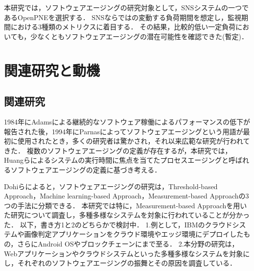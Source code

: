 \documentclass[twoside,twocolumn,10pt]{jarticle}  %
\begin{document}
本研究では，ソフトウェアエージングの研究対象として，SNSシステムの一つであるOpenPNEを選択する．
SNSならではの変動する負荷期間を想定し，監視期間における3種類のメトリクスに着目する．
その結果，比較的低い一定負荷においても，少なくともソフトウェアエージングの潜在可能性を確認できた(暫定)．

\section{関連研究と動機}
\subsection{関連研究}
1984年にAdams\cite{Adams1984Optimizing}による継続的なソフトウェア稼働によるパフォーマンスの低下が報告された後，1994年にParnas\cite{Parnas1994Software}によってソフトウェアエージングという用語が最初に使用されたとき，多くの研究者は驚かされ，それ以来広範な研究が行われてきた．
複数のソフトウェアエージングの定義が存在するが，本研究では，Huangら\cite{Huang1995Software}によるシステムの実行時間に焦点を当てたプロセスエージングと呼ばれるソフトウェアエージングの定義に基づき考える．

Dohiら\cite{Dohi2020Handbook}によると，ソフトウェアエージングの研究は，Threshold-based Approach，Machine learning-based Approach，Measurement-based Approachの3つの手法に分類できる．
本研究では特に，Measurement-based Approachを用いた研究について調査し，多種多様なシステムを対象に行われていることが分かった．
以下，書き方1と2のどちらかで検討中．
1.例として，IBMのクラウドシステム\cite{Sukhwani2017Monitoringa}や画像判定アプリケーションをクラウド環境やエッジ環境にデプロイしたもの\cite{Andrade2020Softwarea}\cite{Andrade2021Memorya}\cite{Andrade2023Comparativea}，さらにAndroid OS\cite{Araujo2013Investigative}\cite{Cotroneo2016Software}\cite{Cotroneo2020Comprehensive}やブロックチェーンにまで至る．
2.本分野の研究は，Webアプリケーション\cite{Grottke2006Analysis}\cite{Matias2006Experimental}やクラウドシステム\cite{Sukhwani2017Monitoringa}\cite{Andrade2020Softwarea}\cite{Andrade2021Memorya}\cite{Andrade2023Comparativea}といった多種多様なシステムを対象にし，それぞれのソフトウェアエージングの振舞とその原因を調査している．
\end{document}
